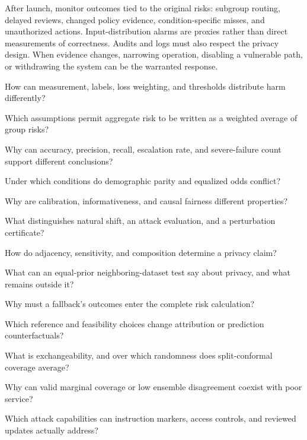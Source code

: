 After launch, monitor outcomes tied to the original risks: subgroup routing, delayed reviews, changed policy evidence, condition-specific misses, and unauthorized actions. Input-distribution alarms are proxies rather than direct measurements of correctness. Audits and logs must also respect the privacy design. When evidence changes, narrowing operation, disabling a vulnerable path, or withdrawing the system can be the warranted response.

\begin{studyquestions}
\item How can measurement, labels, loss weighting, and thresholds distribute harm differently?
\item Which assumptions permit aggregate risk to be written as a weighted average of group risks?
\item Why can accuracy, precision, recall, escalation rate, and severe-failure count support different conclusions?
\item Under which conditions do demographic parity and equalized odds conflict?
\item Why are calibration, informativeness, and causal fairness different properties?
\item What distinguishes natural shift, an attack evaluation, and a perturbation certificate?
\item How do adjacency, sensitivity, and composition determine a privacy claim?
\item What can an equal-prior neighboring-dataset test say about privacy, and what remains outside it?
\item Why must a fallback's outcomes enter the complete risk calculation?
\item Which reference and feasibility choices change attribution or prediction counterfactuals?
\item What is exchangeability, and over which randomness does split-conformal coverage average?
\item Why can valid marginal coverage or low ensemble disagreement coexist with poor service?
\item Which attack capabilities can instruction markers, access controls, and reviewed updates actually address?
\end{studyquestions}

